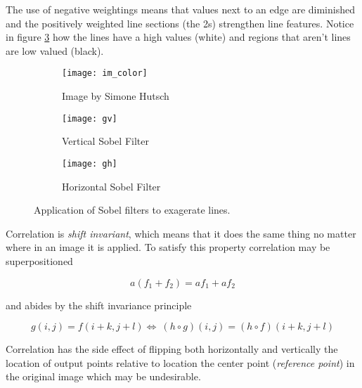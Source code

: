 The use of negative weightings means that values next to an edge are diminished and the positively weighted line sections (the 2s) strengthen line features. Notice in figure \ref{fig:sobel_apply} how the lines have a high values (white) and regions that aren't lines are low valued (black).

\begin{figure}[H]
  \centering
  \begin{subfigure}[b]{0.3\textwidth}
      \texttt{[image: im\_color]}
      \caption{Image by Simone Hutsch}
  \end{subfigure}
  \begin{subfigure}[b]{0.3\textwidth}
      \texttt{[image: gv]}
      \caption{Vertical Sobel Filter}
      \label{fig:vert}
  \end{subfigure}
  \begin{subfigure}[b]{0.3\textwidth}
      \texttt{[image: gh]}
      \caption{Horizontal Sobel Filter}
      \label{fig:hoz}
  \end{subfigure}
  \caption{Application of Sobel filters to exagerate lines.}
  \label{fig:sobel_apply}
\end{figure}

Correlation is \emph{shift invariant}, which means that it does the same thing no matter where in an image it is applied. To satisfy this property correlation may be superpositioned 

\[a(f_1 + f_2) = af_1 + af_2\]

and abides by the shift invariance principle

\[g(i,j)=f(i+k,j+l) \Leftrightarrow\ (h\circ g)(i,j)=(h\circ f)(i+k,j+l)\]

Correlation has the side effect of flipping both horizontally and vertically the location of output points relative to location the center point (\emph{reference point}) in the original image which may be undesirable.

